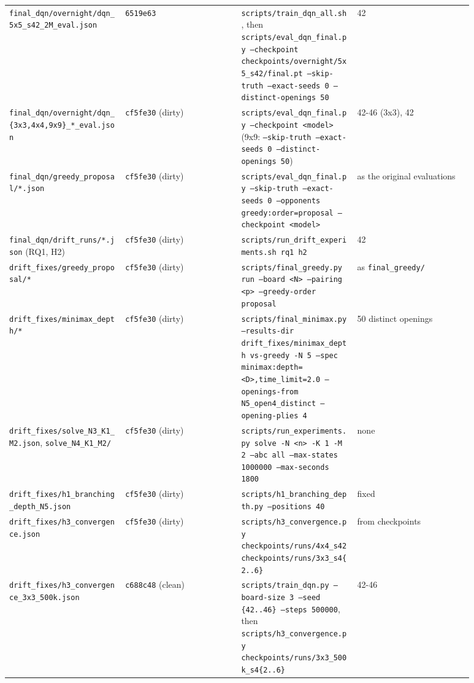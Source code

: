 \documentclass[11pt]{article}
\begin{document}
\begin{center}
\begin{longtable}{p{0.22\linewidth}p{0.22\linewidth}p{0.22\linewidth}p{0.22\linewidth}}
\texttt{final\_dqn/overnight/dqn\_5x5\_s42\_2M\_eval.json} & \texttt{6519e63} & \texttt{scripts/train\_dqn\_all.sh}, then \texttt{scripts/eval\_dqn\_final.py --checkpoint checkpoints/overnight/5x5\_s42/final.pt --skip-truth --exact-seeds 0 --distinct-openings 50} & 42 \\
\texttt{final\_dqn/overnight/dqn\_\{3x3,4x4,9x9\}\_*\_eval.json} & \texttt{cf5fe30} (dirty) & \texttt{scripts/eval\_dqn\_final.py --checkpoint <model>} (9x9: \texttt{--skip-truth --exact-seeds 0 --distinct-openings 50}) & 42-46 (3x3), 42 \\
\texttt{final\_dqn/greedy\_proposal/*.json} & \texttt{cf5fe30} (dirty) & \texttt{scripts/eval\_dqn\_final.py --skip-truth --exact-seeds 0 --opponents greedy:order=proposal --checkpoint <model>} & as the original evaluations \\
\texttt{final\_dqn/drift\_runs/*.json} (RQ1, H2) & \texttt{cf5fe30} (dirty) & \texttt{scripts/run\_drift\_experiments.sh rq1 h2} & 42 \\
\texttt{drift\_fixes/greedy\_proposal/*} & \texttt{cf5fe30} (dirty) & \texttt{scripts/final\_greedy.py run --board <N> --pairing <p> --greedy-order proposal} & as \texttt{final\_greedy/} \\
\texttt{drift\_fixes/minimax\_depth/*} & \texttt{cf5fe30} (dirty) & \texttt{scripts/final\_minimax.py --results-dir drift\_fixes/minimax\_depth vs-greedy -N 5 --spec minimax:depth=<D>,time\_limit=2.0 --openings-from N5\_open4\_distinct --opening-plies 4} & 50 distinct openings \\
\texttt{drift\_fixes/solve\_N3\_K1\_M2.json}, \texttt{solve\_N4\_K1\_M2/} & \texttt{cf5fe30} (dirty) & \texttt{scripts/run\_experiments.py solve -N <n> -K 1 -M 2 --abc all --max-states 1000000 --max-seconds 1800} & none \\
\texttt{drift\_fixes/h1\_branching\_depth\_N5.json} & \texttt{cf5fe30} (dirty) & \texttt{scripts/h1\_branching\_depth.py --positions 40} & fixed \\
\texttt{drift\_fixes/h3\_convergence.json} & \texttt{cf5fe30} (dirty) & \texttt{scripts/h3\_convergence.py checkpoints/runs/4x4\_s42 checkpoints/runs/3x3\_s4\{2..6\}} & from checkpoints \\
\texttt{drift\_fixes/h3\_convergence\_3x3\_500k.json} & \texttt{c688c48} (clean) & \texttt{scripts/train\_dqn.py --board-size 3 --seed \{42..46\} --steps 500000}, then \texttt{scripts/h3\_convergence.py checkpoints/runs/3x3\_500k\_s4\{2..6\}} & 42-46 \\
\bottomrule
\end{longtable}
\end{center}
\end{document}
